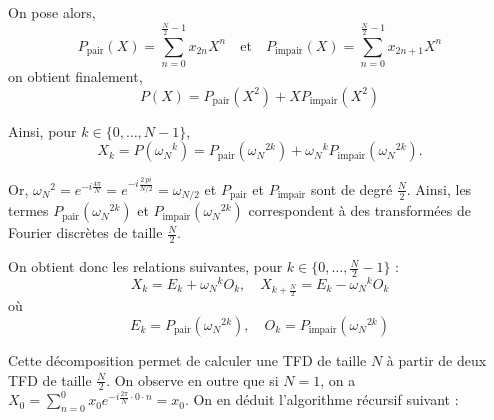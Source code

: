 On pose alors,
$$
P_{\text{pair}}(X) = \sum_{n=0}^{\frac{N}{2}-1} x_{2 n} X^n \quad \text{et} \quad P_{\text{impair}}(X) = \sum_{n=0}^{\frac{N}{2}-1} x_{2 n + 1} X^n
$$
on obtient finalement,
$$
P(X) = P_{\text{pair}}(X^2) + X P_{\text{impair}}(X^2)
$$

Ainsi, pour $k \in \{0, \dots, N - 1\}$,
$$
X_k = P({\omega_N}^k) = P_{\text{pair}}({\omega_N}^{2 k}) + {\omega_N}^k P_{\text{impair}}({\omega_N}^{2 k}).
$$

Or, ${\omega_N}^{2} = e^{-i \frac{4 \pi}{N}} = e^{-i \frac{2\ pi}{N / 2}} = {\omega_{N / 2}}$ et $P_{\text{pair}}$ et $P_{\text{impair}}$ sont de degré $\tfrac{N}{2}$. Ainsi, les termes $P_{\text{pair}}({\omega_N}^{2 k})$ et $P_{\text{impair}}({\omega_N}^{2 k})$ correspondent à des transformées de Fourier discrètes de taille $\tfrac{N}{2}$.

On obtient donc les relations suivantes, pour $k \in \{0, \dots, \frac{N}{2}-1\}$ :
$$
X_k = E_k + {\omega_N}^k O_k, \quad X_{k + \frac{N}{2}} = E_k - {\omega_N}^k O_k
$$
où
$$
E_k = P_{\text{pair}}({\omega_N}^{2 k}), \quad O_k = P_{\text{impair}}({\omega_N}^{2 k})
$$

Cette décomposition permet de calculer une TFD de taille $N$ à partir de deux TFD de taille $\tfrac{N}{2}$. On observe en outre que si $N = 1$, on a $X_0 = \sum_{n=0}^{0} x_0 e^{-i \frac{2 \pi}{N} \cdot 0 \cdot n} = x_0$. On en déduit l'algorithme récursif suivant :

\begin{algorithm}[H]
\DontPrintSemicolon
{}



\caption{Algorithme de Cooley-Tukey\cite{algo-fft}}
\end{algorithm}

